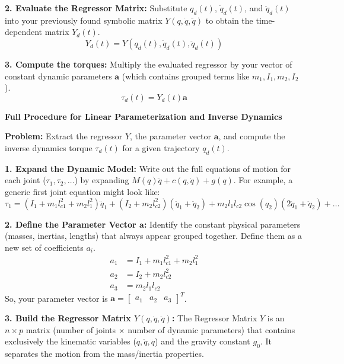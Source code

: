 \documentclass[11pt,a4paper]{article}
\begin{document}
\textbf{2. Evaluate the Regressor Matrix:} 
Substitute $q_d(t)$, $\dot{q}_d(t)$, and $\ddot{q}_d(t)$ into your previously found symbolic matrix $Y(q, \dot{q}, \ddot{q})$ to obtain the time-dependent matrix $Y_d(t)$.
\begin{equation*}
    Y_d(t) = Y(q_d(t), \dot{q}_d(t), \ddot{q}_d(t))
\end{equation*}

\textbf{3. Compute the torques:} 
Multiply the evaluated regressor by your vector of constant dynamic parameters $\mathbf{a}$ (which contains grouped terms like $m_1, I_1, m_2, I_2$).
\begin{equation*}
    \tau_d(t) = Y_d(t) \mathbf{a}
\end{equation*}

\textbf{\large Full Procedure for Linear Parameterization and Inverse Dynamics}

\textbf{Problem:} Extract the regressor $Y$, the parameter vector $\mathbf{a}$, and compute the inverse dynamics torque $\tau_d(t)$ for a given trajectory $q_d(t)$.
\vspace{0.2cm}

\textbf{1. Expand the Dynamic Model:}
Write out the full equations of motion for each joint ($\tau_1, \tau_2, \dots$) by expanding $M(q)\ddot{q} + c(q,\dot{q}) + g(q)$. For example, a generic first joint equation might look like:
\begin{equation*}
    \tau_1 = (I_1 + m_1 l_{c1}^2 + m_2 l_1^2)\ddot{q}_1 + (I_2 + m_2 l_{c2}^2)(\ddot{q}_1 + \ddot{q}_2) + m_2 l_1 l_{c2} \cos(q_2)(2\ddot{q}_1 + \ddot{q}_2) + \dots
\end{equation*}

\textbf{2. Define the Parameter Vector $\mathbf{a}$:}
Identify the constant physical parameters (masses, inertias, lengths) that always appear grouped together. Define them as a new set of coefficients $a_i$.
\begin{align*}
    a_1 &= I_1 + m_1 l_{c1}^2 + m_2 l_1^2 \\
    a_2 &= I_2 + m_2 l_{c2}^2 \\
    a_3 &= m_2 l_1 l_{c2}
\end{align*}
So, your parameter vector is $\mathbf{a} = \begin{bmatrix} a_1 & a_2 & a_3 \end{bmatrix}^T$.

\textbf{3. Build the Regressor Matrix $Y(q, \dot{q}, \ddot{q})$:}
The Regressor Matrix $Y$ is an $n \times p$ matrix (number of joints $\times$ number of dynamic parameters) that contains exclusively the kinematic variables ($q, \dot{q}, \ddot{q}$) and the gravity constant $g_0$. It separates the motion from the mass/inertia properties.
\end{document}
